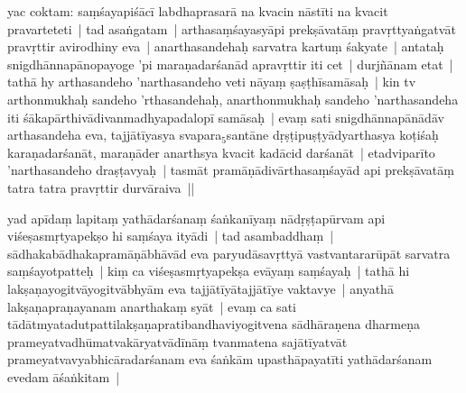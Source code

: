 \documentclass[article,12pt,a4paper]{memoir}%
\newcounter{parCount}
\begin{document}
	  
	  \pstart \leavevmode%
	\label{thakur75-43.4}yac coktam: saṃśayapiśācī labdhaprasarā na kvacin nāstīti na kvacit pravarteteti | tad asaṅgatam | arthasaṃśayasyāpi prekṣāvatāṃ pravṛttyaṅgatvāt pravṛttir avirodhiny eva | anarthasandehaḥ sarvatra kartuṃ śakyate | antataḥ snigdhānnapānopayoge 'pi maraṇadarśanād apravṛttir iti cet | durjñānam etat | tathā hy arthasandeho 'narthasandeho veti nāyaṃ ṣaṣṭhīsamāsaḥ | kin tv arthonmukhaḥ sandeho 'rthasandehaḥ, anarthonmukhaḥ sandeho 'narthasandeha iti śākapārthivādivanmadhyapadalopī samāsaḥ | evaṃ sati snigdhānnapānādāv arthasandeha eva, tajjātīyasya svapara{\tiny $_{5}$}santāne dṛṣṭipuṣṭyādyarthasya koṭiśaḥ karaṇadarśanāt, maraṇāder anarthsya kvacit kadācid darśanāt | \label{ratnakīrtinibandhāvali__36r1PF7IMW5NG28AHCCLVFKB31B}etadviparīto\label{ratnakīrtinibandhāvali__36r1PF7IMW4W5CE0I89H8GG6RQN} 'narthasandeho draṣṭavyaḥ | tasmāt pramāṇādivārthasaṃśayād api prekṣāvatāṃ tatra tatra pravṛttir durvāraiva ||
	{}
	\pend%
      

	  
	  \pstart \leavevmode%
	\label{thakur75-43.13}yad apīdaṃ lapitaṃ yathādarśanaṃ śaṅkanīyaṃ nādṛṣṭapūrvam api viśeṣasmṛtyapekṣo hi saṃśaya ityādi | tad asambaddhaṃ | sādhakabādhakapramāṇābhāvād eva paryudāsavṛttyā \label{ratnakīrtinibandhāvali__36r1PF7IMW45SFTLRLUVTIHXJ6N}vastvantara\label{ratnakīrtinibandhāvali__36r1PF7IMW3EBY5XOPZTJQUZJ9I}rūpāt sarvatra saṃśayotpatteḥ | kiṃ ca viśeṣasmṛtyapekṣa evāyaṃ saṃśayaḥ | tathā hi lakṣaṇayogitvāyogitvābhyām eva tajjātīyātajjātīye vaktavye | anyathā lakṣaṇapraṇayanam anarthakaṃ syāt | evaṃ ca sati tādātmyatadutpattilakṣaṇapratibandhaviyogitvena sādhāraṇena dharmeṇa prameyatvadhūmatvakārya\leavevmode{}tvādīnāṃ tvanmatena sajātīyatvāt prameyatvavyabhicāradarśanam eva śaṅkām upasthāpayatīti yathādarśanam evedam āśaṅkitam |
	{}
	\pend%
      
\end{document}
